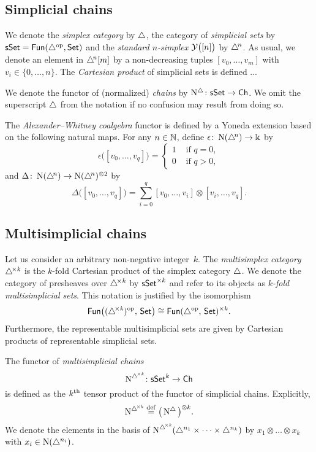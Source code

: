 \subsection{Simplicial chains}

We denote the \textit{simplex category} by $\triangle$, the category of \textit{simplicial sets} by $\mathsf{sSet} = \mathsf{Fun}(\triangle^{\mathrm{op}}, \mathsf{Set})$ and the \textit{standard $n$-simplex} $\mathcal{Y}\big([n]\big)$ by $\triangle^{\!n}$.
As usual, we denote an element in $\triangle^{\!n}[m]$ by a non-decreasing tuples $[v_0, \dots, v_m]$ with $v_i \in \{0, \dots, n\}$.
The \textit{Cartesian product} of simplicial sets is defined ...

We denote the functor of (normalized) \textit{chains} by $\operatorname{N^{\triangle}} \colon \mathsf{sSet} \to \mathsf{Ch}$.
We omit the superscript $\triangle$ from the notation if no confusion may result from doing so.

The \textit{Alexander--Whitney coalgebra} functor is defined by a Yoneda extension based on the following natural maps.
For any $n \in \mathbb{N}$, define $\epsilon \colon \operatorname{N}(\triangle^{\!n}) \to \Bbbk$ by
\[
\epsilon \big( [v_0, \dots, v_q] \big) = \begin{cases} 1 & \text{ if } q = 0, \\ 0 & \text{ if } q>0, \end{cases}
\]
and $\Delta \colon \operatorname{N}(\triangle^{\!n}) \to \operatorname{N}(\triangle^{\!n})^{\otimes2}$ by
\[
\Delta \big( [v_0, \dots, v_q] \big) = \sum_{i=0}^q [v_0, \dots, v_i] \otimes [v_i, \dots, v_q].
\]

\subsection{Multisimplicial chains}

Let us consider an arbitrary non-negative integer~$k$.
The \textit{multisimplex category} $\triangle^{\!\times\mathit{k}}$ is the $k$-fold Cartesian product of the simplex category $\triangle$.
We denote the category of presheaves over $\triangle^{\!\times\mathit{k}}$ by $\mathsf{sSet}^{\times k}$ and refer to its objects as \textit{$k$-fold multisimplicial sets}.
This notation is justified by the isomorphism
\[
\mathsf{Fun} \big( (\triangle^{\!\times\mathit{k}})^{\mathrm{op}},\, \mathsf{Set} \big) \cong
\mathsf{Fun}(\triangle^{\mathrm{op}},\, \mathsf{Set})^{\times k}.
\]
Furthermore, the representable multisimplicial sets are given by Cartesian products of representable simplicial sets.

The functor of \textit{multisimplicial chains}
\[
\operatorname{\operatorname{N}^{\triangle^{\!\times\mathit{k}}}} \colon \mathsf{sSet}^k \to \mathsf{Ch}
\]
is defined as the $k^{\mathrm{th}}$ tensor product of the functor of simplicial chains.
Explicitly,
\[
\operatorname{\operatorname{N}^{\triangle^{\!\times\mathit{k}}}} \stackrel{\mathrm{def}}{=} \big( \operatorname{N^{\triangle}} \big)^{\otimes k}.
\]
We denote the elements in the basis of $\operatorname{\operatorname{N}^{\triangle^{\!\times\mathit{k}}}}(\triangle^{n_1} \times \dots \times \triangle^{n_k})$ by $x_1 \otimes \dots \otimes x_k$ with $x_i \in \operatorname{N}(\triangle^{n_i})$.

